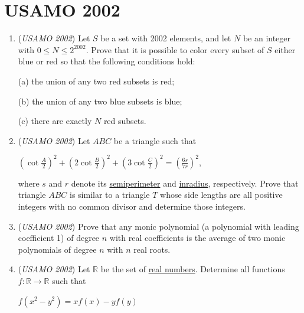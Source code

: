 \section{USAMO 2002}
        \begin{enumerate}
        	\item (\textit{USAMO 2002}) Let $S$ be a set with 2002 elements, and let $N$ be an integer with $0 \le N \le 2^{2002}$.  Prove that it is possible to color every subset of $S$ either blue or red so that the following conditions hold:


 (a) the union of any two red subsets is red;


 (b) the union of any two blue subsets is blue;


 (c) there are exactly $N$ red subsets.


 

	\item (\textit{USAMO 2002}) Let $ABC$ be a triangle such that


 
$\left( \cot \frac{A}{2} \right)^2 + \left( 2 \cot \frac{B}{2} \right)^2 + \left( 3 \cot \frac{C}{2} \right)^2 = \left( \frac{6s}{7r} \right)^2$,


 


 where $s$ and $r$ denote its \href{https://artofproblemsolving.com/wiki/index.php?title=Semiperimeter}{semiperimeter} and \href{https://artofproblemsolving.com/wiki/index.php?title=Inradius}{inradius}, respectively.  Prove that triangle $ABC$ is similar to a triangle $T$ whose side lengths are all positive integers with no common divisor and determine those integers.


 

	\item (\textit{USAMO 2002}) Prove that any monic polynomial (a polynomial with leading coefficient 1) of degree $n$ with real coefficients is the average of two monic polynomials of degree $n$ with $n$ real roots.


 

	\item (\textit{USAMO 2002}) Let $\mathbb{R}$ be the set of \href{https://artofproblemsolving.com/wiki/index.php?title=Real\_number}{real numbers}.  Determine all functions $f : \mathbb{R} \rightarrow \mathbb{R}$ such that


 
$f(x^2 - y^2) = xf(x) - yf(y)$


 



\end{enumerate}
